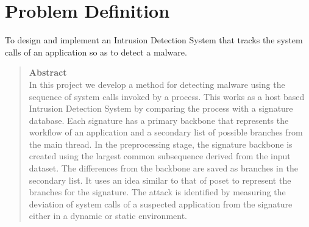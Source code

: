 \section{Problem Definition}

\textsf{To design and implement an Intrusion Detection System that tracks the system calls of an application so as to detect a malware.} \\

\begin{quotation}
    \hspace{100pt} \textbf{Abstract} \\
\textsf{In this project we develop a method for detecting malware using the sequence of system calls invoked by a process. This works as a host based Intrusion Detection System by comparing the process with a signature database. Each signature has a primary backbone that represents the workflow of an application and a secondary list of possible branches from the main thread. In the preprocessing stage, the signature backbone is created using the largest common subsequence derived from the input dataset. The differences from the backbone are saved as branches in the secondary list. It uses an idea similar to that of poset to represent the branches for the signature. The attack is identified by measuring the deviation of system calls of a suspected application from the signature either in a dynamic or static environment.}
\end{quotation}
